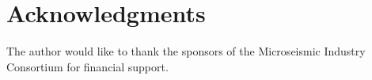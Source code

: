 \documentclass[letterpaper,11pt]{article}
\begin{document}
\section*{Acknowledgments}
%
The author would like to thank the sponsors of the Microseismic Industry Consortium for financial support.



\end{document}
